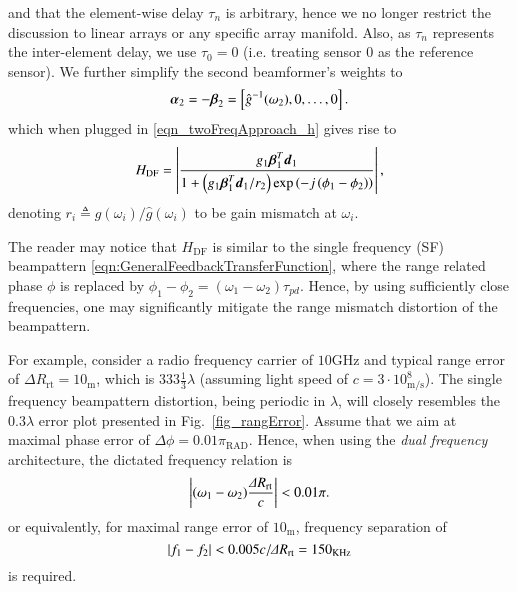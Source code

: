 and that the element-wise delay $\tau_n$ is arbitrary, hence we no longer restrict the discussion to linear arrays or any specific array manifold. Also, as $\tau_n$ represents the inter-element delay, we use $\tau_0=0$ (i.e. treating sensor $0$ as the reference sensor).
We further simplify the second beamformer's weights to 
\begin{equation}\label{eq_simpleBeta}
    \vAlpha_{2}=-\vBeta_{2}=\vBrace{\hat{g}^{-1}(\omega_2),0,\hdots,0}.
\end{equation}
which when plugged in \eqref{eqn_twoFreqApproach_h} gives rise to 
\begin{equation}
    H_{\text{DF}} = \lBrace{\frac{g_{1}\vBetaT_{1}\vd_{1}}{1+
    \rBrace{g_{1}\vBetaT_{1}\vd_{1}/r_{2}}\exp\rBrace{-j\rBrace{\phi_{1}-\phi_{2}}}
    }},
    \label{eq_H_DF_general}
\end{equation}
denoting $r_i\triangleq{}g(\omega_i)/\hat{g}(\omega_i)$ to be gain mismatch at $\omega_i$. 
\par The reader may notice that  $H_{\text{DF}}$ is similar to the single frequency (SF) beampattern \eqref{eqn:GeneralFeedbackTransferFunction}, where the range related phase $\phi$ is replaced by $\phi_{1}-\phi_{2}=(\omega_1-\omega_2)\tau_{pd}$. Hence, by using sufficiently close frequencies, one may significantly mitigate the range mismatch distortion of the beampattern.
\par For example, consider a radio frequency carrier of $10\text{GHz}$ and typical range error of $\Delta{}R_{\text{rt}}=10_{\text{m}}$, which is $333\frac{1}{3}\lambda$ (assuming light speed of $c=3\cdot 10^{8}_{\text{m/s}}$). The single frequency beampattern distortion, being periodic in $\lambda$, will closely resembles the $0.3\lambda$ error plot presented in Fig.~\ref{fig_rangError}. Assume that we aim at maximal phase error of $\Delta \phi=0.01\pi_{\text{RAD}}$. Hence, when using the \textit{dual frequency} architecture, the dictated frequency relation is
\begin{equation}\label{eq_DF_phErr}
\abs{(\omega_1-\omega_2)\frac{\Delta{}R_{\text{rt}}}{c}}<0.01\pi.
\end{equation}
or equivalently, for maximal range error of $10_\text{m}$, frequency separation of
\[
\left\vert f_1-f_2\right\vert<0.005 c/\Delta{}R_{\text{rt}}=150_{\text{KHz}}
\]
is required. 

